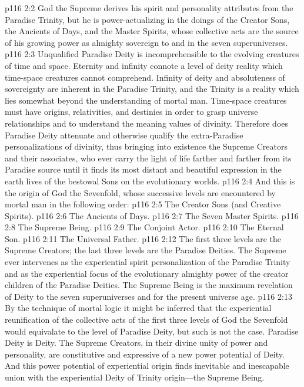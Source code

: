 \vs p116 2:2 God the Supreme derives his spirit and personality attributes from the Paradise Trinity, but he is power\hyp{}actualizing in the doings of the Creator Sons, the Ancients of Days, and the Master Spirits, whose collective acts are the source of his growing power as almighty sovereign to and in the seven superuniverses.
\pc \vs p116 2:3 Unqualified Paradise Deity is incomprehensible to the evolving creatures of time and space. Eternity and infinity connote a level of deity reality which time\hyp{}space creatures cannot comprehend. Infinity of deity and absoluteness of sovereignty are inherent in the Paradise Trinity, and the Trinity is a reality which lies somewhat beyond the understanding of mortal man. Time\hyp{}space creatures must have origins, relativities, and destinies in order to grasp universe relationships and to understand the meaning values of divinity. Therefore does Paradise Deity attenuate and otherwise qualify the extra\hyp{}Paradise personalizations of divinity, thus bringing into existence the Supreme Creators and their associates, who ever carry the light of life farther and farther from its Paradise source until it finds its most distant and beautiful expression in the earth lives of the bestowal Sons on the evolutionary worlds.
\vs p116 2:4 And this is the origin of God the Sevenfold, whose successive levels are encountered by mortal man in the following order:
\pc \vs p116 2:5 \bibnobreakspace The Creator Sons (and Creative Spirits).
\vs p116 2:6 \bibnobreakspace The Ancients of Days.
\vs p116 2:7 \bibnobreakspace The Seven Master Spirits.
\vs p116 2:8 \bibnobreakspace The Supreme Being.
\vs p116 2:9 \bibnobreakspace The Conjoint Actor.
\vs p116 2:10 \bibnobreakspace The Eternal Son.
\vs p116 2:11 \bibnobreakspace The Universal Father.
\pc \vs p116 2:12 The first three levels are the Supreme Creators; the last three levels are the Paradise Deities. The Supreme ever intervenes as the experiential spirit personalization of the Paradise Trinity and as the experiential focus of the evolutionary almighty power of the creator children of the Paradise Deities. The Supreme Being is the maximum revelation of Deity to the seven superuniverses and for the present universe age.
\vs p116 2:13 By the technique of mortal logic it might be inferred that the experiential reunification of the collective acts of the first three levels of God the Sevenfold would equivalate to the level of Paradise Deity, but such is not the case. Paradise Deity is  Deity. The Supreme Creators, in their divine unity of power and personality, are constitutive and expressive of a new power potential of  Deity. And this power potential of experiential origin finds inevitable and inescapable union with the experiential Deity of Trinity origin---the Supreme Being.
